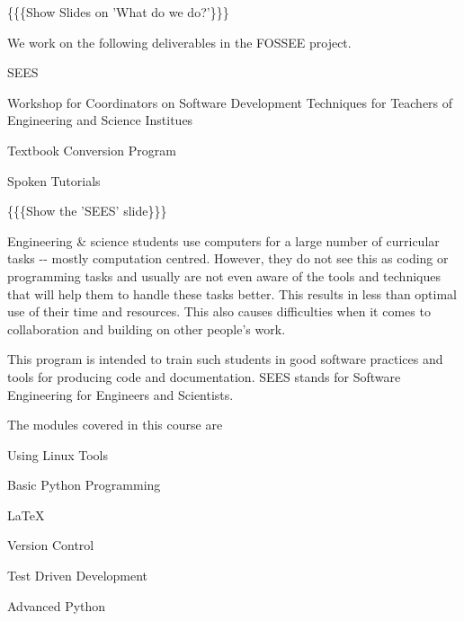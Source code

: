 \documentclass[a4paper,english]{article}
\begin{document}

\{\{\{Show Slides on 'What do we do?'\}\}\}


We work on the following deliverables in the FOSSEE project.
\setcounter{listcnt0}{0}
\begin{list}{.}
{
\setlength{\rightmargin}{\leftmargin}
}

\item SEES

\item Workshop for Coordinators on Software Development Techniques for Teachers of Engineering and Science Institues

\item Textbook Conversion Program

\item Spoken Tutorials
\end{list}


\{\{\{Show the 'SEES' slide\}\}\}


Engineering \& science students use computers for a large number of curricular tasks -{}- mostly computation centred. However, they do not see this as coding or programming tasks and usually are not even aware of the tools and techniques that will help them to handle these tasks better. This results in less than optimal use of their time and resources. This also causes difficulties when it comes to collaboration and building on other people's work.

This program is intended to train such students in good software practices and tools for producing code and documentation. SEES stands for Software Engineering for Engineers and Scientists.

The modules covered in this course are
\setcounter{listcnt0}{0}
\begin{list}{.}
{
\setlength{\rightmargin}{\leftmargin}
}

\item Using Linux Tools

\item Basic Python Programming

\item LaTeX

\item Version Control

\item Test Driven Development

\item Advanced Python
\end{list}
\end{document}

